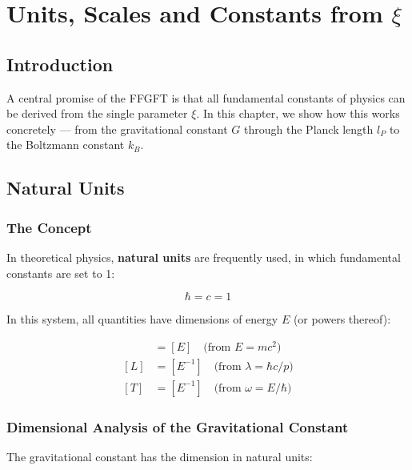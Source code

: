 
\chapter{Units, Scales and Constants from $\xi$}

\section{Introduction}

A central promise of the FFGFT is that all fundamental constants of physics 
can be derived from the single parameter $\xi$. In this chapter, we show 
how this works concretely — from the gravitational constant $G$ through 
the Planck length $l_P$ to the Boltzmann constant $k_B$.

\section{Natural Units}

\subsection{The Concept}

In theoretical physics, \textbf{natural units} are frequently used, in which 
fundamental constants are set to 1:

\begin{equation}
	\hbar = c = 1
	\label{eq:natural_units}
\end{equation}

In this system, all quantities have dimensions of energy $E$ (or powers thereof):

\begin{align}
	[M] &= [E] \quad \text{(from } E = mc^2\text{)} \\
	[L] &= [E^{-1}] \quad \text{(from } \lambda = \hbar c/p\text{)} \\
	[T] &= [E^{-1}] \quad \text{(from } \omega = E/\hbar\text{)}
\end{align}

\subsection{Dimensional Analysis of the Gravitational Constant}

The gravitational constant has the dimension in natural units:


